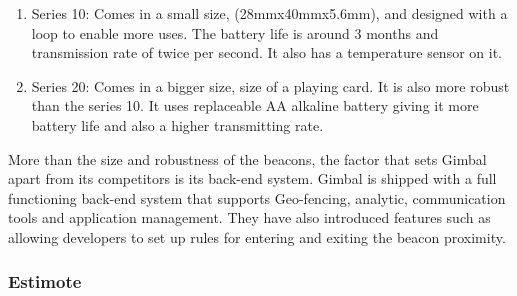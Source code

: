 \begin{enumerate}
\item Series 10: Comes in a small size, (28mmx40mmx5.6mm), and designed with
a loop to enable more uses. The battery life is around
3 months and transmission rate of twice per second. It also has a
temperature sensor on it.
\item Series 20: Comes in a bigger size, size of a playing card. It is also
more robust than the series 10. It uses replaceable AA alkaline battery
giving it more battery life and also a higher transmitting rate.
\end{enumerate}
More than the size and robustness of the beacons, the factor that
sets Gimbal apart from its competitors is its back-end system. Gimbal
is shipped with a full functioning back-end system that supports Geo-fencing\cite{geofencing},
analytic, communication tools and application management. They have
also introduced features such as allowing developers to set up rules
for entering and exiting the beacon proximity.


\subsubsection{Estimote}

